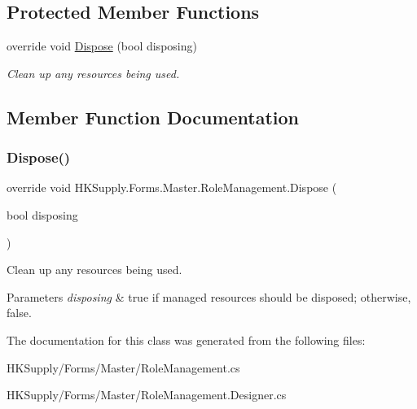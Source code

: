 \subsection*{Protected Member Functions}
\begin{DoxyCompactItemize}
\item 
override void \hyperlink{class_h_k_supply_1_1_forms_1_1_master_1_1_role_management_aec6f44de37a82c49e6166b2d83e65885}{Dispose} (bool disposing)
\begin{DoxyCompactList}\small\item\em Clean up any resources being used. \end{DoxyCompactList}\end{DoxyCompactItemize}


\subsection{Member Function Documentation}
\mbox{\label{class_h_k_supply_1_1_forms_1_1_master_1_1_role_management_aec6f44de37a82c49e6166b2d83e65885}} 
\subsubsection{\texorpdfstring{Dispose()}{Dispose()}}
{\footnotesize\ttfamily override void H\+K\+Supply.\+Forms.\+Master.\+Role\+Management.\+Dispose (\begin{DoxyParamCaption}\item[{bool}]{disposing }\end{DoxyParamCaption})\hspace{0.3cm}{\ttfamily [protected]}}



Clean up any resources being used. 


\begin{DoxyParams}{Parameters}
{\em disposing} & true if managed resources should be disposed; otherwise, false.\\
\hline
\end{DoxyParams}


The documentation for this class was generated from the following files\+:\begin{DoxyCompactItemize}
\item 
H\+K\+Supply/\+Forms/\+Master/Role\+Management.\+cs\item 
H\+K\+Supply/\+Forms/\+Master/Role\+Management.\+Designer.\+cs\end{DoxyCompactItemize}
